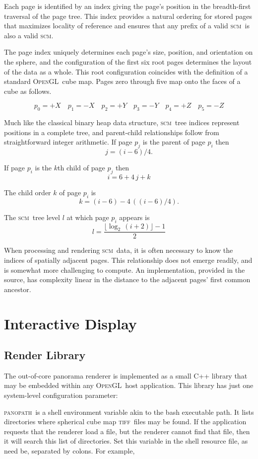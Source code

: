 \documentclass[oneside,11pt]{memoir}
\newcommand{\opengl}  {\textsc{OpenGL}}
\newcommand{\scm}     {\textsc{scm}}
\newcommand{\tiff}    {\textsc{tiff}}
\newcommand{\panopath}{\textsc{panopath}}
\begin{document}
\begin{Spacing}{1.1}
Each page is identified by an index giving the page's position in the breadth-first traversal of the page tree. This index provides a natural ordering for stored pages that maximizes locality of reference and ensures that any prefix of a valid \scm\ is also a valid \scm.

The page index uniquely determines each page's size, position, and orientation on the sphere, and the configuration of the first six root pages determines the layout of the data as a whole. This root configuration coincides with the definition of a standard \opengl\ cube map. Pages zero through five map onto the faces of a cube as follows.

\[p_0=+X\quad p_1=-X\quad p_2=+Y\quad p_3=-Y\quad p_4=+Z\quad p_5=-Z\]

Much like the classical binary heap data structure, \scm\ tree indices represent positions in a complete tree, and parent-child relationships follow from straightforward integer arithmetic. If page $p_j$ is the parent of page $p_i$ then
\[j=(i-6)/4.\]

If page $p_i$ is the $k$th child of page $p_j$ then
\[i=6+4\,j+k\]

The child order $k$ of page $p_i$ is
\[k=(i-6)-4\,((i-6)/4).\]

The \scm\ tree level $l$ at which page $p_i$ appears is
\[l=\frac{\lfloor\log_2\,(i+2)\rfloor - 1}{2}\]

When processing and rendering \scm\ data, it is often necessary to know the indices of spatially adjacent pages. This relationship does not emerge readily, and is somewhat more challenging to compute. An implementation, provided in the source, has complexity linear in the distance to the adjacent pages' first common ancestor.

\chapter{Interactive Display}

\section{Render Library}

The out-of-core panorama renderer is implemented as a small C++ library that may be embedded within any \opengl\ host application. This library has just one system-level configuration parameter:

\panopath\ is a shell environment variable akin to the bash executable path. It lists directories where spherical cube map \tiff\ files may be found. If the application requests that the renderer load a file, but the renderer cannot find that file, then it will search this list of directories. Set this variable in the shell resource file, as need be, separated by colons. For example,


\end{Spacing}
\end{document}
